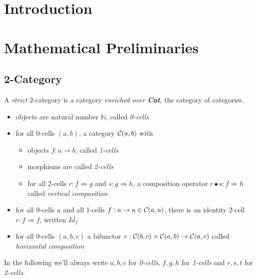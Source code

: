 \documentclass[a4paper]{article}
\begin{document}
\maketitle



\section{Introduction}
\label{sec:intro}

\section{Mathematical Preliminaries}
\label{sec:prelim}

\subsection{2-Category}

A \emph{strict} 2-category \catC is a category \emph{enriched over \textbf{Cat}}, the category of categories.

\begin{itemize}
\item objects are natural number $\mathbb{N}$, called \emph{0-cells}
\item for all 0-cells $(a, b)$, a category ${\cal C}(a, b)$ with
\begin{itemize}
\item objects $f: a \to b$, called \emph{1-cells}
\item morphisms are called \emph{2-cells}
\item for all 2-cells $r: f \Rightarrow g$ and $s: g \Rightarrow h$, a composition operator $r \bullet s: f \Rightarrow h$ called \emph{vertical composition}
\end{itemize}
\item for all 0-cells $a$ and all 1-cells $f: a \to a \in {\cal C}(a, a)$, there is an identity 2-cell $r: f \Rightarrow f$, written $Id_f$
\item for all 0-cells $(a, b, c)$ a bifunctor $\circ: {\cal C}(b, c) \times {\cal C}(a, b) \to {\cal C}(a, c)$ called \emph{horizontal composition}
\end{itemize}

In the following we'll always write $a, b, c$ for \emph{0-cells}, $f, g, h$ for \emph{1-cells} and $r, s, t$ for \emph{2-cells}.
\end{document}
